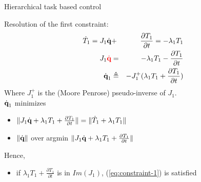 %
%

\begin{frame} {Hierarchical task based control}

  Resolution of the first constraint:
  \begin{eqnarray}\label{eq:constraint-1}
    \dot{T}_1 = J_1\dot{\textbf{q}} &+& \frac{\partial T_1}{\partial t}  = - \lambda_1 T_1\\
    J_1{\color{red} \dot{\textbf{q}}} &=& - \lambda_1 T_1 - \frac{\partial T_1}{\partial t} \\
    \dot{\textbf{q}}_1 &\triangleq& -J_1 ^{+} (\lambda_1 T_1 + \frac{\partial T_1}{\partial t} )
  \end{eqnarray}
  \pause
  Where $J_1^+$ is the (Moore Penrose) pseudo-inverse of $J_1$.\\
  \pause
  $\dot{\textbf{q}}_1$ minimizes
  \begin{itemize}
  \item $\|J_1\dot{\textbf{q}} + \lambda_1 T_1 + \frac{\partial T_1}{\partial t} \| = \|\dot{T}_1 + \lambda_1 T_1\|$
    \pause
  \item $\|\dot{\textbf{q}}\|$ over \mbox{argmin} $\|J_1\dot{\textbf{q}} + \lambda_1 T_1 + \frac{\partial T_1}{\partial t} \|$
  \end{itemize}
  \pause
  Hence,
  \begin{itemize}
  \item if $\lambda_1 T_1 + \frac{\partial T_1}{\partial t} $ is in $Im(J_1)$, (\ref{eq:constraint-1}) is satisfied
  \end{itemize}

\end{frame}

%
%


